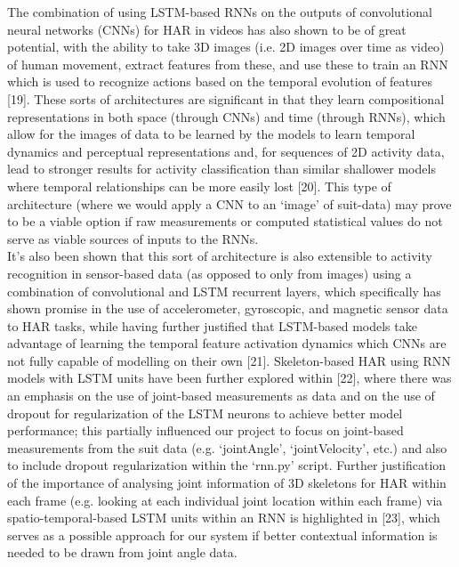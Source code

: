 \documentclass[12pt,twoside]{report}
\begin{document}
\quad The combination of using LSTM-based RNNs on the outputs of convolutional neural networks (CNNs) for HAR in videos has also shown to be of great potential, with the ability to take 3D images (i.e. 2D images over time as video) of human movement, extract features from these, and use these to train an RNN which is used to recognize actions based on the temporal evolution of features [19]. These sorts of architectures are significant in that they learn compositional representations in both space (through CNNs) and time (through RNNs), which allow for the images of data to be learned by the models to learn temporal dynamics and perceptual representations and, for sequences of 2D activity data, lead to stronger results for activity classification than similar shallower models where temporal relationships can be more easily lost [20]. This type of architecture (where we would apply a CNN to an ‘image’ of suit-data) may prove to be a viable option if raw measurements or computed statistical values do not serve as viable sources of inputs to the RNNs.\\

\quad It’s also been shown that this sort of architecture is also extensible to activity recognition in sensor-based data (as opposed to only from images) using a combination of convolutional and LSTM recurrent layers, which specifically has shown promise in the use of accelerometer, gyroscopic, and magnetic sensor data to HAR tasks, while having further justified that LSTM-based models take advantage of learning the temporal feature activation dynamics which CNNs are not fully capable of modelling on their own [21]. Skeleton-based HAR using RNN models with LSTM units have been further explored within [22], where there was an emphasis on the use of joint-based measurements as data and on the use of dropout for regularization of the LSTM neurons to achieve better model performance; this partially influenced our project to focus on joint-based measurements from the suit data (e.g. ‘jointAngle’, ‘jointVelocity’, etc.) and also to include dropout regularization within the ‘rnn.py’ script. Further justification of the importance of analysing joint information of 3D skeletons for HAR within each frame (e.g. looking at each individual joint location within each frame) via spatio-temporal-based LSTM units within an RNN is highlighted in [23], which serves as a possible approach for our system if better contextual information is needed to be drawn from joint angle data.
\end{document}
